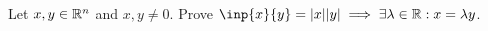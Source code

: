 \documentclass[../hw1.tex]{subfiles}
\begin{document}
\begin{problem}
Let $x,y\in \mathbb{R}^{n}$ and $x,y\neq 0$. Prove $\inp{x}{y}=|x||y|\implies \exists \lambda\in \R : x=\lambda y$.
\end{problem}
\end{document}
